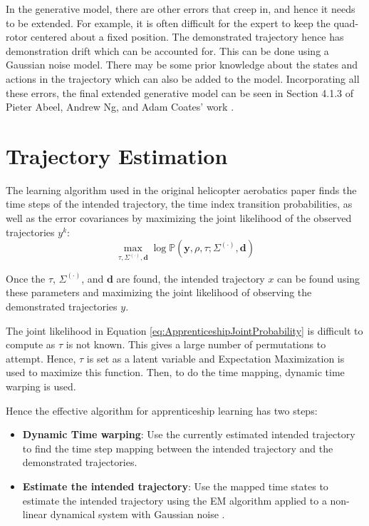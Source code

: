 \documentclass[hidelinks,BTech]{iitmdiss}
\begin{document}
In the generative model, there are other errors that creep in, and hence it needs to be extended. For example, it is often difficult for the expert to keep the quad-rotor centered about a fixed position. The demonstrated trajectory hence has demonstration drift which can be accounted for. This can be done using a Gaussian noise model. There may be some prior knowledge about the states and actions in the trajectory which can also be added to the model. Incorporating all these errors, the final extended generative model can be seen in Section 4.1.3 of Pieter Abeel, Andrew Ng, and Adam Coates' work \cite{ApprenticeshipHelicopterAerobatics}.

\section{Trajectory Estimation}

The learning algorithm used in the original helicopter aerobatics paper \cite{ApprenticeshipHelicopterAerobatics} finds the time steps of the intended trajectory, the time index transition probabilities, as well as the error covariances by maximizing the joint likelihood of the observed trajectories $y^k$:
\begin{equation} \label{eq:ApprenticeshipJointProbability}
  \max_{\tau, \Sigma^{(\cdot)}, \mathbf{d}} \log \mathbb{P}(\mathbf{y}, \rho, \tau ; \Sigma^{(\cdot)}, \mathbf{d})
\end{equation}

Once the $\tau$, $\Sigma^{(\cdot)}$, and $\mathbf{d}$ are found, the intended trajectory $x$ can be found using these parameters and maximizing the joint likelihood of observing the demonstrated trajectories $y$.

The joint likelihood in Equation \ref{eq:ApprenticeshipJointProbability} is difficult to compute as $\tau$ is not known. This gives a large number of permutations to attempt. Hence, $\tau$ is set as a latent variable and Expectation Maximization is used to maximize this function. Then, to do the time mapping, dynamic time warping \cite{DTW} is used.

Hence the effective algorithm for apprenticeship learning has two steps:
\begin{itemize}
\item{{\bf Dynamic Time warping}: Use the currently estimated intended trajectory to find the time step mapping between the intended trajectory and the demonstrated trajectories.}
\item{{\bf Estimate the intended trajectory}: Use the mapped time states to estimate the intended trajectory using the EM algorithm applied to a non-linear dynamical system with Gaussian noise \cite{NonLinearEMKalman}.}
\end{itemize}
\end{document}
